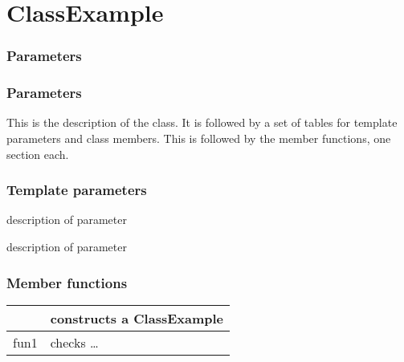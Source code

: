 \documentclass[letterpaper,10pt,english]{sphinxmanual}
\begin{document}
\section{ClassExample}
\label{\detokenize{style-guide/ClassExample:classexample}}\label{\detokenize{style-guide/ClassExample::doc}}\subsubsection*{Parameters}
\subsubsection*{Parameters}

\begin{sphinxVerbatim}[commandchars=\\\{\}]
     
     
  
\end{sphinxVerbatim}

This is the description of the class. It is followed by a set of
tables for template parameters and class members. This is followed by
the member functions, one section each.
\subsubsection*{Template parameters}

\begin{DUlineblock}{0em}
\item[]  \sphinxhyphen{} description of parameter
\item[]  \sphinxhyphen{} description of parameter
\end{DUlineblock}
\subsubsection*{Member functions}


\begin{savenotes}\sphinxattablestart
\centering
\begin{tabulary}{\linewidth}[t]{|T|T|}
\hline

{\hyperref[\detokenize{style-guide/ClassExample:constructor}]{}}
&
constructs a ClassExample
\\
\hline
fun1
&
checks …
\\
\hline
\end{tabulary}
\par
\sphinxattableend\end{savenotes}
\end{document}
